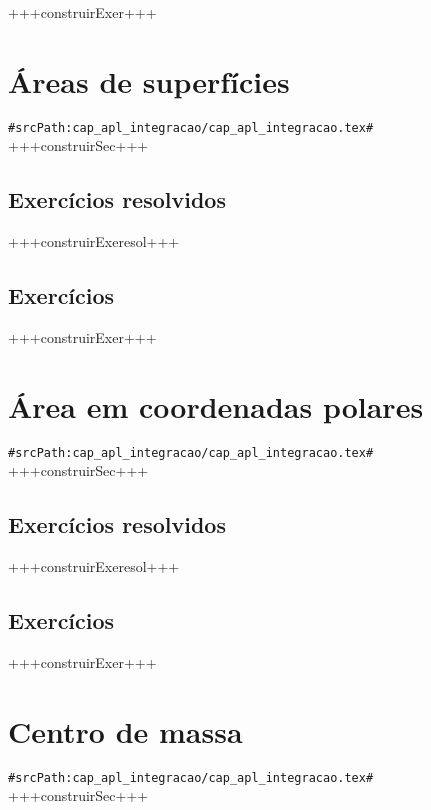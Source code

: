+++construirExer+++




\section{Áreas de superfícies}
\verb+#srcPath:cap_apl_integracao/cap_apl_integracao.tex#+
+++construirSec+++

\subsection*{Exercícios resolvidos}

+++construirExeresol+++


\subsection*{Exercícios}

+++construirExer+++






\section{Área em coordenadas polares}
\verb+#srcPath:cap_apl_integracao/cap_apl_integracao.tex#+
+++construirSec+++

\subsection*{Exercícios resolvidos}

+++construirExeresol+++


\subsection*{Exercícios}

+++construirExer+++




\section{Centro de massa}
\verb+#srcPath:cap_apl_integracao/cap_apl_integracao.tex#+
+++construirSec+++

